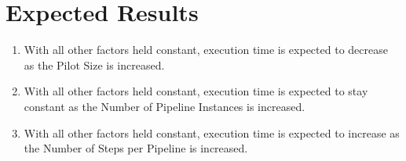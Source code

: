 \documentclass{article}
\begin{document}
	\section*{Expected Results}
	\begin{enumerate}
		\item With all other factors held constant, execution time is expected to decrease as the Pilot Size is increased.
		\item With all other factors held constant, execution time is expected to stay constant as the Number of Pipeline Instances is increased.
		\item With all other factors held constant, execution time is expected to increase as the Number of Steps per Pipeline is increased.
	\end{enumerate}
\end{document}

